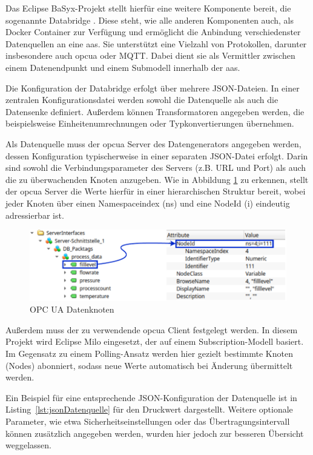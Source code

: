 Das Eclipse BaSyx-Projekt stellt hierfür eine weitere Komponente bereit, die sogenannte Databridge \cite{BaSyxDatabridge}.
Diese steht, wie alle anderen Komponenten auch, als Docker Container zur Verfügung und ermöglicht die Anbindung verschiedenster Datenquellen an eine \acs{aas}.
Sie unterstützt eine Vielzahl von Protokollen, darunter insbesondere auch \acs{opcua} oder MQTT.
Dabei dient sie als Vermittler zwischen einem Datenendpunkt und einem Submodell innerhalb der \acs{aas}.

Die Konfiguration der Databridge erfolgt über mehrere JSON-Dateien.
In einer zentralen Konfigurationsdatei werden sowohl die Datenquelle als auch die Datensenke definiert.
Außerdem können Transformatoren angegeben werden, die beispielsweise Einheitenumrechnungen oder Typkonvertierungen übernehmen.

Als Datenquelle muss der \acs{opcua} Server des Datengenerators angegeben werden, dessen Konfiguration typischerweise in einer separaten JSON-Datei erfolgt.
Darin sind sowohl die Verbindungsparameter des Servers (z.B. URL und Port) als auch die zu überwachenden Knoten anzugeben.
Wie in Abbildung \ref{fig:OPCUADatenStruktur} zu erkennen, stellt der \acs{opcua} Server die Werte hierfür in einer hierarchischen Struktur bereit, wobei jeder Knoten über einen Namespaceindex (ns) und eine NodeId (i) eindeutig adressierbar ist.

\begin{figure}[htbp]
    \centering
    \includegraphics[width=1\textwidth]{Bilder/OPCUA/OPCUADaten.pdf}
    \caption{OPC UA Datenknoten}
    \label{fig:OPCUADatenStruktur}
\end{figure}

Außerdem muss der zu verwendende \acs{opcua} Client festgelegt werden.
In diesem Projekt wird Eclipse Milo eingesetzt, der auf einem Subscription-Modell basiert.
Im Gegensatz zu einem Polling-Ansatz werden hier gezielt bestimmte Knoten (Nodes) abonniert, sodass neue Werte automatisch bei Änderung übermittelt werden.

Ein Beispiel für eine entsprechende JSON-Konfiguration der Datenquelle ist in Listing~\ref{lst:jsonDatenquelle} für den Druckwert dargestellt.
Weitere optionale Parameter, wie etwa Sicherheitseinstellungen oder das Übertragungsintervall können zusätzlich angegeben werden, wurden hier jedoch zur besseren Übersicht weggelassen.

